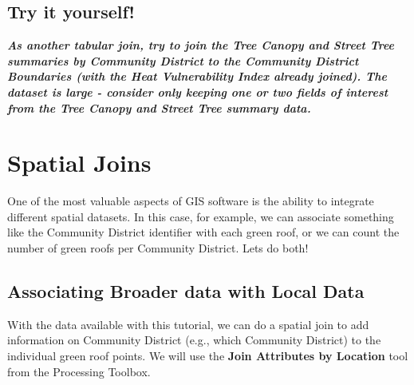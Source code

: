\documentclass[
  letterpaper,
  DIV=11,
  numbers=noendperiod]{scrreprt}
\begin{document}
\hypertarget{try-it-yourself}{%
\subsection{Try it yourself!}\label{try-it-yourself}}

\textbf{\emph{As another tabular join, try to join the Tree Canopy and
Street Tree summaries by Community District to the Community District
Boundaries (with the Heat Vulnerability Index already joined). The
dataset is large - consider only keeping one or two fields of interest
from the Tree Canopy and Street Tree summary data.}}

\hypertarget{spatial-joins}{%
\section{Spatial Joins}\label{spatial-joins}}

One of the most valuable aspects of GIS software is the ability to
integrate different spatial datasets. In this case, for example, we can
associate something like the Community District identifier with each
green roof, or we can count the number of green roofs per Community
District. Lets do both!

\hypertarget{associating-broader-data-with-local-data}{%
\subsection{Associating Broader data with Local
Data}\label{associating-broader-data-with-local-data}}

With the data available with this tutorial, we can do a spatial join to
add information on Community District (e.g., which Community District)
to the individual green roof points. We will use the \textbf{Join
Attributes by Location} tool from the Processing Toolbox.
\end{document}
